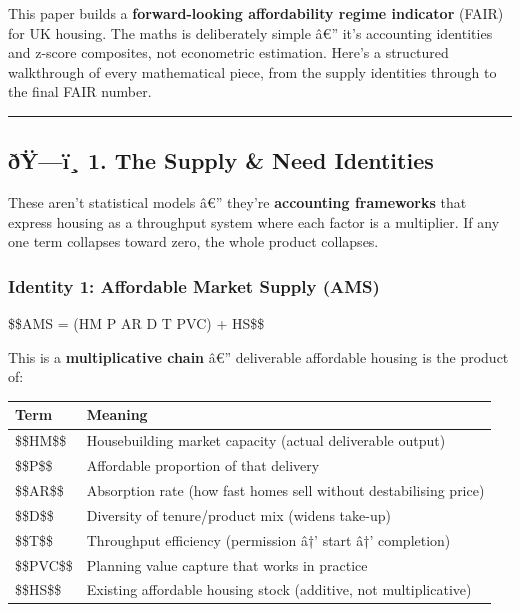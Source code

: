 This paper builds a \textbf{forward-looking affordability regime
indicator} (FAIR) for UK housing. The maths is deliberately simple â€''
it's accounting identities and z-score composites, not econometric
estimation. Here's a structured walkthrough of every mathematical piece,
from the supply identities through to the final FAIR number.

\begin{center}\rule{0.5\linewidth}{0.5pt}\end{center}

\subsection{ðŸ---ï¸ 1. The Supply \& Need
Identities}\label{uxf0uxffuxef-1.-the-supply-need-identities}

These aren't statistical models â€'' they're \textbf{accounting
frameworks} that express housing as a throughput system where each
factor is a multiplier. If any one term collapses toward zero, the whole
product collapses.

\subsubsection{Identity 1: Affordable Market Supply
(AMS)}\label{identity-1-affordable-market-supply-ams-1}

\$\$AMS = (HM \cdot P \cdot AR \cdot D \cdot T \cdot PVC) + HS\$\$

This is a \textbf{multiplicative chain} â€'' deliverable affordable
housing is the product of:

{\def\LTcaptype{none} %
\begin{longtable}[]{@{}
  >{\raggedright\arraybackslash}p{}
  >{\raggedright\arraybackslash}p{}@{}}
\toprule\noalign{}
\begin{minipage}[b]{\linewidth}\raggedright
\textbf{Term}
\end{minipage} & \begin{minipage}[b]{\linewidth}\raggedright
\textbf{Meaning}
\end{minipage} \\
\midrule\noalign{}
\endhead
\bottomrule\noalign{}
\endlastfoot
\$\$HM\$\$ & Housebuilding market capacity (actual deliverable
output) \\
\$\$P\$\$ & Affordable proportion of that delivery \\
\$\$AR\$\$ & Absorption rate (how fast homes sell without destabilising
price) \\
\$\$D\$\$ & Diversity of tenure/product mix (widens take-up) \\
\$\$T\$\$ & Throughput efficiency (permission â†' start â†'
completion) \\
\$\$PVC\$\$ & Planning value capture that works in practice \\
\$\$HS\$\$ & Existing affordable housing stock (additive, not
multiplicative) \\
\end{longtable}
}

